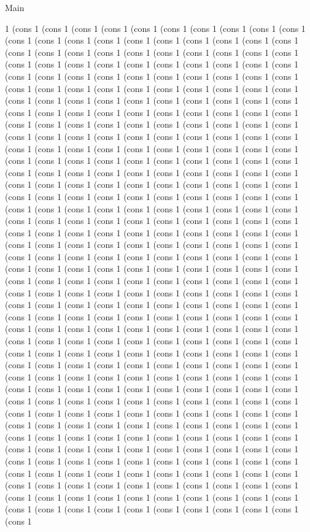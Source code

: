 \begin{lexlean}{Main}
\begin{semanticmodule}
1 (cons 1 (cons 1 (cons 1 (cons 1 (cons 1 (cons 1 (cons 1 (cons 1 (cons 1 (cons 1 (cons 1 (cons 1 (cons 1 (cons 1 (cons 1 (cons 1 (cons 1 (cons 1 (cons 1 (cons 1 (cons 1 (cons 1 (cons 1 (cons 1 (cons 1 (cons 1 (cons 1 (cons 1 (cons 1 (cons 1 (cons 1 (cons 1 (cons 1 (cons 1 (cons 1 (cons 1 (cons 1 (cons 1 (cons 1 (cons 1 (cons 1 (cons 1 (cons 1 (cons 1 (cons 1 (cons 1 (cons 1 (cons 1 (cons 1 (cons 1 (cons 1 (cons 1 (cons 1 (cons 1 (cons 1 (cons 1 (cons 1 (cons 1 (cons 1 (cons 1 (cons 1 (cons 1 (cons 1 (cons 1 (cons 1 (cons 1 (cons 1 (cons 1 (cons 1 (cons 1 (cons 1 (cons 1 (cons 1 (cons 1 (cons 1 (cons 1 (cons 1 (cons 1 (cons 1 (cons 1 (cons 1 (cons 1 (cons 1 (cons 1 (cons 1 (cons 1 (cons 1 (cons 1 (cons 1 (cons 1 (cons 1 (cons 1 (cons 1 (cons 1 (cons 1 (cons 1 (cons 1 (cons 1 (cons 1 (cons 1 (cons 1 (cons 1 (cons 1 (cons 1 (cons 1 (cons 1 (cons 1 (cons 1 (cons 1 (cons 1 (cons 1 (cons 1 (cons 1 (cons 1 (cons 1 (cons 1 (cons 1 (cons 1 (cons 1 (cons 1 (cons 1 (cons 1 (cons 1 (cons 1 (cons 1 (cons 1 (cons 1 (cons 1 (cons 1 (cons 1 (cons 1 (cons 1 (cons 1 (cons 1 (cons 1 (cons 1 (cons 1 (cons 1 (cons 1 (cons 1 (cons 1 (cons 1 (cons 1 (cons 1 (cons 1 (cons 1 (cons 1 (cons 1 (cons 1 (cons 1 (cons 1 (cons 1 (cons 1 (cons 1 (cons 1 (cons 1 (cons 1 (cons 1 (cons 1 (cons 1 (cons 1 (cons 1 (cons 1 (cons 1 (cons 1 (cons 1 (cons 1 (cons 1 (cons 1 (cons 1 (cons 1 (cons 1 (cons 1 (cons 1 (cons 1 (cons 1 (cons 1 (cons 1 (cons 1 (cons 1 (cons 1 (cons 1 (cons 1 (cons 1 (cons 1 (cons 1 (cons 1 (cons 1 (cons 1 (cons 1 (cons 1 (cons 1 (cons 1 (cons 1 (cons 1 (cons 1 (cons 1 (cons 1 (cons 1 (cons 1 (cons 1 (cons 1 (cons 1 (cons 1 (cons 1 (cons 1 (cons 1 (cons 1 (cons 1 (cons 1 (cons 1 (cons 1 (cons 1 (cons 1 (cons 1 (cons 1 (cons 1 (cons 1 (cons 1 (cons 1 (cons 1 (cons 1 (cons 1 (cons 1 (cons 1 (cons 1 (cons 1 (cons 1 (cons 1 (cons 1 (cons 1 (cons 1 (cons 1 (cons 1 (cons 1 (cons 1 (cons 1 (cons 1 (cons 1 (cons 1 (cons 1 (cons 1 (cons 1 (cons 1 (cons 1 (cons 1 (cons 1 (cons 1 (cons 1 (cons 1 (cons 1 (cons 1 (cons 1 (cons 1 (cons 1 (cons 1 (cons 1 (cons 1 (cons 1 (cons 1 (cons 1 (cons 1 (cons 1 (cons 1 (cons 1 (cons 1 (cons 1 (cons 1 (cons 1 (cons 1 (cons 1 (cons 1 (cons 1 (cons 1 (cons 1 (cons 1 (cons 1 (cons 1 (cons 1 (cons 1 (cons 1 (cons 1 (cons 1 (cons 1 (cons 1 (cons 1 (cons 1 (cons 1 (cons 1 (cons 1 (cons 1 (cons 1 (cons 1 (cons 1 (cons 1 (cons 1 (cons 1 (cons 1 (cons 1 (cons 1 (cons 1 (cons 1 (cons 1 (cons 1 (cons 1 (cons 1 (cons 1 (cons 1 (cons 1 (cons 1 (cons 1 (cons 1 (cons 1 (cons 1 (cons 1 (cons 1 (cons 1 (cons 1 (cons 1 (cons 1 (cons 1 (cons 1 (cons 1 (cons 1 (cons 1 (cons 1 (cons 1 (cons 1 (cons 1 (cons 1 (cons 1 (cons 1 (cons 1 (cons 1 (cons 1 (cons 1 (cons 1 (cons 1 (cons 1 (cons 1 (cons 1 (cons 1 (cons 1 (cons 1 (cons 1 (cons 1 (cons 1 (cons 1 (cons 1 (cons 1 (cons 1 (cons 1 (cons 1 (cons 1 (cons 1 (cons 1 (cons 1 (cons 1 (cons 1 (cons 1 (cons 1 (cons 1 (cons 1 (cons 1 (cons 1 (cons 1 (cons 1 (cons 1 (cons 1 (cons 1 (cons 1 (cons 1 (cons 1 (cons 1 (cons 1 (cons 1 (cons 1 (cons 1 (cons 1 (cons 1 (cons 1 (cons 1 (cons 1 (cons 1 (cons 1 (cons 1 (cons 1 (cons 1 (cons 1 (cons 1 (cons 1 (cons 1 (cons 1 (cons 1 (cons 1 (cons 1 (cons 1 (cons 1 (cons 1 (cons 1 (cons 1 (cons 1 (cons 1 (cons 1 (cons 1 (cons 1 (cons 1 (cons 1 (cons 1 (cons 1 (cons 1 
\end{semanticmodule}
\end{lexlean}
